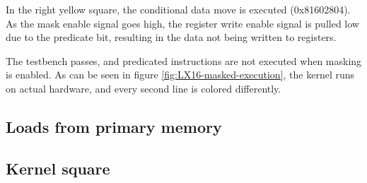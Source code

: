 \documentclass[../main/report.tex]{subfiles}
\begin{document}
In the right yellow square, the conditional data move is executed (0x81602804).
As the mask enable signal goes high, the register write enable signal is pulled low due to the predicate bit, resulting in the data not being written to registers.

The testbench passes, and predicated instructions are not executed when masking is enabled.
As can be seen in figure \ref{fig:LX16-masked-execution}, the kernel runs on actual hardware, and every second line is colored differently.

\subsection{Loads from primary memory}

\subsection{Kernel square}




\end{document}
